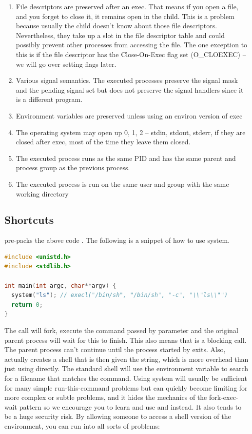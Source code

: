 \begin{enumerate}
\item File descriptors are preserved after an exec. That means if you open a file, and you forget to close it, it remains open in the child.
  This is a problem because usually the child doesn't know about those file descriptors. Nevertheless, they take up a slot in the file descriptor table and could possibly prevent other processes from accessing the file.
  The one exception to this is if the file descriptor has the Close-On-Exec flag set (O\_CLOEXEC) -- we will go over setting flags later.
\item Various signal semantics. The executed processes preserve the signal mask and the pending signal set but does not preserve the signal handlers since it is a different program.
\item Environment variables are preserved unless using an environ version of exec
\item The operating system may open up 0, 1, 2 -- stdin, stdout, stderr, if they are closed after exec, most of the time they leave them closed.
\item The executed process runs as the same PID and has the same parent and process group as the previous process.
\item The executed process is run on the same user and group with the same working directory
\end{enumerate}

\subsection{Shortcuts}

 pre-packs the above code \cite[P. 371]{jones2010wg14}.
The following is a snippet of how to use system.

\begin{lstlisting}[language=C]
#include <unistd.h>
#include <stdlib.h>

int main(int argc, char**argv) {
  system("ls"); // execl("/bin/sh", "/bin/sh", "-c", "\\"ls\\"")
  return 0;
}
\end{lstlisting}

The  call will fork, execute the command passed by parameter and the original parent process will wait for this to finish.
This also means that  is a blocking call.
The parent process can't continue until the process started by  exits.
Also,  actually creates a shell that is then given the string, which is more overhead than just using  directly.
The standard shell will use the  environment variable to search for a filename that matches the command.
Using system will usually be sufficient for many simple run-this-command problems but can quickly become limiting for more complex or subtle problems, and it hides the mechanics of the fork-exec-wait pattern so we encourage you to learn and use   and  instead.
It also tends to be a huge security risk.
By allowing someone to access a shell version of the environment, you can run into all sorts of problems:


